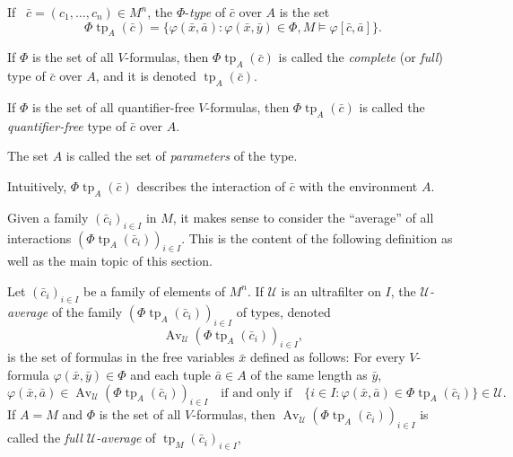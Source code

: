 \documentclass{scrartcl}
\DeclareMathOperator{\Av}{Av }
\DeclareMathOperator{\tp}{tp}
\renewcommand{\phi}{\varphi}
\newcommand{\SU}{\mathscr{U}}
\begin{document}
\begin{definition}
If  $\bar c= (c_1,\dots, c_n)\in M^n$, the $\Phi$-\emph{type} of $\bar c$ over $A$ is the set 
\[
\Phi\tp_A(\bar c)=
\{\varphi(\bar x, \bar a) \colon \varphi(\bar x, \bar y)\in\Phi, M\models\varphi[\bar c, \bar a] \}.
\]

If $\Phi$ is the set of all $V$-formulas, then $\Phi\tp_A(\bar c)$ is called the \emph{complete} (or \emph{full}) type of $\bar c$ over $A$, and it is denoted $\tp_A(\bar c)$.

If $\Phi$ is the set of all quantifier-free $V$-formulas, then $\Phi\tp_A(\bar c)$ is called the \emph{quantifier-free} type of $\bar c$ over $A$.

The set $A$ is called the set of \emph{parameters} of the type.
\end{definition}

Intuitively, $\Phi\tp_A(\bar c)$ describes the  interaction of 
$\bar c$ with the environment $A$.

Given a family $(\bar{c}_i)_{i\in I}$ in $M$, it makes sense to consider the ``average'' of all interactions $(\Phi\tp_A(\bar c_i))_{i\in I}$. This is the content of the following definition as well as the main topic of this section.

\begin{definition}
Let $(\bar{c}_i)_{i\in I}$ be a family of elements of $M^n$. If $\SU$ is an ultrafilter on $I$, the \emph{$\SU$-average} of the family $(\Phi\tp_A(\bar c_i))_{i\in I}$ of types, denoted
\[
\Av_{\SU} (\Phi\tp_A(\bar c_i))_{i\in I},
\]
is the set of formulas in the free variables $\bar x$ defined as follows: For every $V$-formula $\phi(\bar x, \bar y)\in\Phi$ and each tuple $\bar a\in A$ of the same length as $\bar y$, 
\[
\phi(\bar x,\bar a)\in \Av_{\SU}  (\Phi\tp_A(\bar c_i))_{i\in I}
\quad\text{if and only if}\quad
\{i\in I \colon \phi(\bar x,\bar a) \in \Phi\tp_A(\bar c_i)  \}\in \SU.
\]
If $A=M$ and $\Phi$ is the set of all $V$-formulas, then 
$\Av_{\SU} (\Phi\tp_A(\bar c_i))_{i\in I}$ is called the \emph{full $\SU$-average} of
$\tp_M(\bar c_i)_{i\in I}$,
\end{definition}
\end{document}
